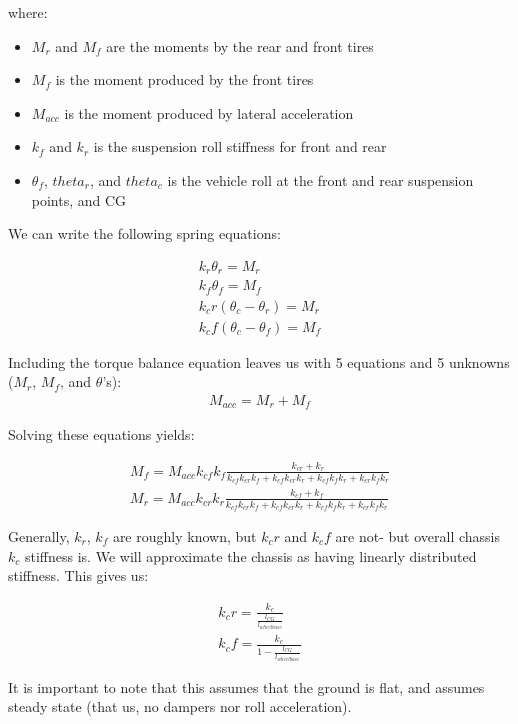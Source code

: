 \documentclass{article}
\begin{document}
where:
\begin{itemize}
\item $M_r$ and $M_f$ are the moments by the rear and front tires
\item $M_f$ is the moment produced by the front tires
\item $M_{acc}$ is the moment produced by lateral acceleration
\item $k_f$ and $k_r$ is the suspension roll stiffness for front and rear
\item $\theta_f$, $theta_r$, and $theta_c$ is the vehicle roll at the front and rear suspension points, and CG
\end{itemize}

We can write the following spring equations:

\begin{align}
	k_r \theta_r = M_r \\
	k_f \theta_f = M_f \\
	k_cr (\theta_c-\theta_r) = M_r \\
	k_cf (\theta_c-\theta_f) = M_f
\end{align}

Including the torque balance equation leaves us with 5 equations and 5 unknowns ($M_r$, $M_f$, and $\theta$'s):
\begin{align}
	M_{acc} = M_r + M_f
\end{align}

Solving these equations yields:

\begin{align}
	M_f = M_{acc} k_{cf} k_f \frac{k_{cr}+k_r}{k_{cf} k_{cr} k_f+k_{cf} k_{cr} k_r+k_{cf} k_f k_r+k_{cr} k_f k_r}\\
    M_r = M_{acc} k_{cr} k_r \frac{k_{cf}+k_f}{k_{cf} k_{cr} k_f+k_{cf} k_{cr} k_r+k_{cf} k_f k_r+k_{cr} k_f k_r}
\end{align}

Generally, $k_r$, $k_f$ are roughly known, but $k_cr$ and $k_cf$ are not- but overall chassis $k_c$ stiffness is. We will approximate the chassis as having linearly distributed stiffness. This gives us:

\begin{align}
	k_cr = \frac{k_c}{\frac{l_{CG}}{l_{wheelbase}}}\\
	k_cf = \frac{k_c}{1 - \frac{l_{CG}}{l_{wheelbase}}}
\end{align}

It is important to note that this assumes that the ground is flat, and assumes steady state (that us, no dampers nor roll acceleration).
\end{document}
